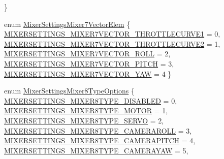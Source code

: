 \begin{DoxyCompactItemize}
 \}
\item 
enum \hyperlink{group___mixer_settings_ga8e68134d8ec762ce62293dc05d533cda}{\-Mixer\-Settings\-Mixer7\-Vector\-Elem} \{ \*
\hyperlink{group___mixer_settings_gga8e68134d8ec762ce62293dc05d533cdaa7e140e94ed65be57c3779e348fb38190}{\-M\-I\-X\-E\-R\-S\-E\-T\-T\-I\-N\-G\-S\-\_\-\-M\-I\-X\-E\-R7\-V\-E\-C\-T\-O\-R\-\_\-\-T\-H\-R\-O\-T\-T\-L\-E\-C\-U\-R\-V\-E1} = 0, 
\hyperlink{group___mixer_settings_gga8e68134d8ec762ce62293dc05d533cdaa01e86c01bc2e5b41c60eb3d789eff873}{\-M\-I\-X\-E\-R\-S\-E\-T\-T\-I\-N\-G\-S\-\_\-\-M\-I\-X\-E\-R7\-V\-E\-C\-T\-O\-R\-\_\-\-T\-H\-R\-O\-T\-T\-L\-E\-C\-U\-R\-V\-E2} = 1, 
\hyperlink{group___mixer_settings_gga8e68134d8ec762ce62293dc05d533cdaabac56ea52d23ff51cb7c333a35a35bbf}{\-M\-I\-X\-E\-R\-S\-E\-T\-T\-I\-N\-G\-S\-\_\-\-M\-I\-X\-E\-R7\-V\-E\-C\-T\-O\-R\-\_\-\-R\-O\-L\-L} = 2, 
\hyperlink{group___mixer_settings_gga8e68134d8ec762ce62293dc05d533cdaa42de2c5ade8e46ad057354971f2595f0}{\-M\-I\-X\-E\-R\-S\-E\-T\-T\-I\-N\-G\-S\-\_\-\-M\-I\-X\-E\-R7\-V\-E\-C\-T\-O\-R\-\_\-\-P\-I\-T\-C\-H} = 3, 
\*
\hyperlink{group___mixer_settings_gga8e68134d8ec762ce62293dc05d533cdaa9bd75824d2b83758277541dba8b4a2e9}{\-M\-I\-X\-E\-R\-S\-E\-T\-T\-I\-N\-G\-S\-\_\-\-M\-I\-X\-E\-R7\-V\-E\-C\-T\-O\-R\-\_\-\-Y\-A\-W} = 4
 \}
\item 
enum \hyperlink{group___mixer_settings_ga797cc7cd541e7f1524177fb4820ba9b4}{\-Mixer\-Settings\-Mixer8\-Type\-Options} \{ \*
\hyperlink{group___mixer_settings_gga797cc7cd541e7f1524177fb4820ba9b4ad6117220963e132b2aeae0eace56711d}{\-M\-I\-X\-E\-R\-S\-E\-T\-T\-I\-N\-G\-S\-\_\-\-M\-I\-X\-E\-R8\-T\-Y\-P\-E\-\_\-\-D\-I\-S\-A\-B\-L\-E\-D} = 0, 
\hyperlink{group___mixer_settings_gga797cc7cd541e7f1524177fb4820ba9b4ab65070567a565a975173743e448c3af9}{\-M\-I\-X\-E\-R\-S\-E\-T\-T\-I\-N\-G\-S\-\_\-\-M\-I\-X\-E\-R8\-T\-Y\-P\-E\-\_\-\-M\-O\-T\-O\-R} = 1, 
\hyperlink{group___mixer_settings_gga797cc7cd541e7f1524177fb4820ba9b4a04c8be4e2af68ea8a6a4a39f29034c6d}{\-M\-I\-X\-E\-R\-S\-E\-T\-T\-I\-N\-G\-S\-\_\-\-M\-I\-X\-E\-R8\-T\-Y\-P\-E\-\_\-\-S\-E\-R\-V\-O} = 2, 
\hyperlink{group___mixer_settings_gga797cc7cd541e7f1524177fb4820ba9b4ab897485e2ea87ec7924cafaadf05fdcd}{\-M\-I\-X\-E\-R\-S\-E\-T\-T\-I\-N\-G\-S\-\_\-\-M\-I\-X\-E\-R8\-T\-Y\-P\-E\-\_\-\-C\-A\-M\-E\-R\-A\-R\-O\-L\-L} = 3, 
\*
\hyperlink{group___mixer_settings_gga797cc7cd541e7f1524177fb4820ba9b4aed4bf742c43243541d027aa2668cdf16}{\-M\-I\-X\-E\-R\-S\-E\-T\-T\-I\-N\-G\-S\-\_\-\-M\-I\-X\-E\-R8\-T\-Y\-P\-E\-\_\-\-C\-A\-M\-E\-R\-A\-P\-I\-T\-C\-H} = 4, 
\hyperlink{group___mixer_settings_gga797cc7cd541e7f1524177fb4820ba9b4a33b8829546f0132772deeb9874b68e50}{\-M\-I\-X\-E\-R\-S\-E\-T\-T\-I\-N\-G\-S\-\_\-\-M\-I\-X\-E\-R8\-T\-Y\-P\-E\-\_\-\-C\-A\-M\-E\-R\-A\-Y\-A\-W} = 5, 

\end{DoxyCompactItemize}
